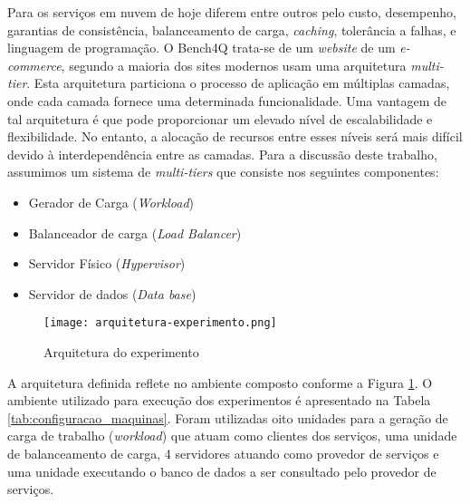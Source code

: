 Para  os serviços em nuvem de hoje diferem entre outros pelo custo, desempenho, garantias de consistência, balanceamento de carga, \textit{caching}, tolerância a falhas,  e linguagem de programação. O Bench4Q trata-se de um \textit{website} de um \textit{e-commerce}, segundo  a maioria dos sites modernos usam uma arquitetura \textit{multi-tier}. Esta arquitetura particiona o processo de aplicação em múltiplas camadas, onde cada camada fornece uma determinada funcionalidade. Uma vantagem de tal arquitetura é que pode proporcionar um elevado nível de escalabilidade e flexibilidade. No entanto, a alocação de recursos entre esses níveis será mais difícil devido à interdependência entre as camadas. Para a discussão deste trabalho, assumimos um sistema de \textit{multi-tiers} que consiste nos seguintes componentes:

\begin{itemize}
	\item Gerador de Carga (\textit{Workload})
	\item Balanceador de carga (\textit{Load Balancer})
	\item Servidor Físico (\textit{Hypervisor})
	\item Servidor de dados (\textit{Data base})
\end{itemize}


\begin{figure}[!htb]
	\centering
	\texttt{[image: arquitetura-experimento.png]}
	\caption{Arquitetura do experimento}
	\label{fig:arquitetura-experimento}
	\fautor
\end{figure}

A arquitetura definida reflete no ambiente composto conforme a Figura \ref{fig:arquitetura-experimento}. O ambiente utilizado para execução dos experimentos é apresentado na Tabela \ref{tab:configuracao_maquinas}.
Foram utilizadas oito unidades para a geração de carga de trabalho (\textit{workload}) que atuam como clientes dos serviços, uma unidade de balanceamento de carga, 4 servidores atuando como provedor de serviços e uma unidade executando o banco de dados a ser consultado pelo provedor de serviços.

